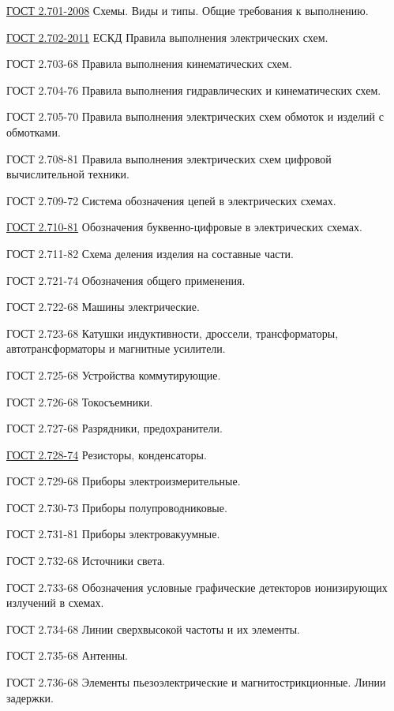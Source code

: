 \label{eskd}

\href{http://rtu.samgtu.ru/sites/rtu.samgtu.ru/files/GOST_ESKD_2.701-2008.pdf}{ГОСТ
2.701-2008} Схемы. Виды и типы. Общие требования к выполнению.

\href{http://www.gostedu.ru/51102.html}{ГОСТ 2.702-2011} ЕСКД
Правила выполнения электрических схем.

ГОСТ 2.703-68  Правила выполнения кинематических схем.

ГОСТ 2.704-76  Правила выполнения гидравлических и кинематических схем.

ГОСТ 2.705-70  Правила выполнения электрических схем обмоток и изделий с обмотками.

ГОСТ 2.708-81  Правила выполнения электрических схем цифровой вычислительной техники.

ГОСТ 2.709-72 Система обозначения цепей в электрических схемах.

\href{http://www.electromonter.info/handbook/symbol\_271081.html}{ГОСТ 2.710-81}
Обозначения буквенно-цифровые в электрических схемах.

ГОСТ 2.711-82 Схема деления изделия на составные части.

ГОСТ 2.721-74 Обозначения общего применения.

ГОСТ 2.722-68 Машины электрические.

ГОСТ 2.723-68 Катушки индуктивности, дроссели, трансформаторы, автотрансформаторы и магнитные усилители.

ГОСТ 2.725-68 Устройства коммутирующие.

ГОСТ 2.726-68 Токосъемники.

ГОСТ 2.727-68 Разрядники, предохранители.

\href{http://www.bmstu.ru/~rl1/courses/inform/gost2\_728-74.pdf}{ГОСТ 2.728-74}
Резисторы, конденсаторы.

ГОСТ 2.729-68 Приборы электроизмерительные.

ГОСТ 2.730-73 Приборы полупроводниковые.

ГОСТ 2.731-81 Приборы электровакуумные.

ГОСТ 2.732-68 Источники света.

ГОСТ 2.733-68 Обозначения условные графические детекторов ионизирующих излучений в схемах.

ГОСТ 2.734-68 Линии сверхвысокой частоты и их элементы.

ГОСТ 2.735-68 Антенны.

ГОСТ 2.736-68 Элементы пьезоэлектрические и магнитострикционные. Линии задержки.

